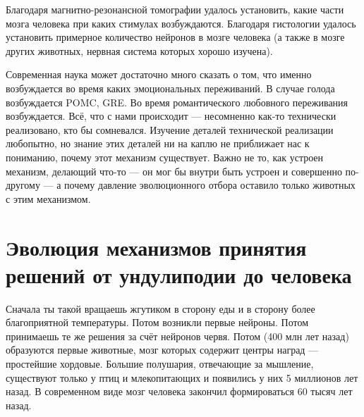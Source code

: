 \documentclass[11pt]{article}
\theoremstyle{remark}
\theoremstyle{definition}
\begin{document}
Благодаря магнитно-резонансной томографии удалось установить, какие части мозга человека при каких стимулах возбуждаются. Благодаря гистологии удалось установить примерное количество нейронов в мозге человека (а также в мозге других животных, нервная система которых хорошо изучена).



Современная наука может достаточно много сказать о том, что именно возбуждается во время каких эмоциональных переживаний. В случае голода возбуждается POMC, GRE. Во время романтического любовного переживания возбуждается. Всё, что с нами происходит --- несомненно как-то технически реализовано, кто бы сомневался. Изучение деталей технической реализации любопытно, но знание этих деталей ни на каплю не приближает нас к пониманию, почему этот механизм существует. Важно не то, как устроен механизм, делающий что-то --- он мог бы внутри быть устроен и совершенно по-другому --- а почему давление эволюционного отбора оставило только животных с этим механизмом.





\section{Эволюция механизмов принятия решений от ундулиподии до человека}

Сначала ты такой вращаешь жгутиком в сторону еды и в сторону более благоприятной температуры. Потом возникли первые нейроны. Потом принимаешь те же решения за счёт нейронов червя. Потом (400 млн лет назад) образуются первые животные, мозг которых содержит центры наград --- простейшие хордовые. Большие полушария, отвечающие за мышление, существуют только у птиц и млекопитающих и появились у них 5 миллионов лет назад. В современном виде мозг человека закончил формироваться 60 тысяч лет назад.
\end{document}

